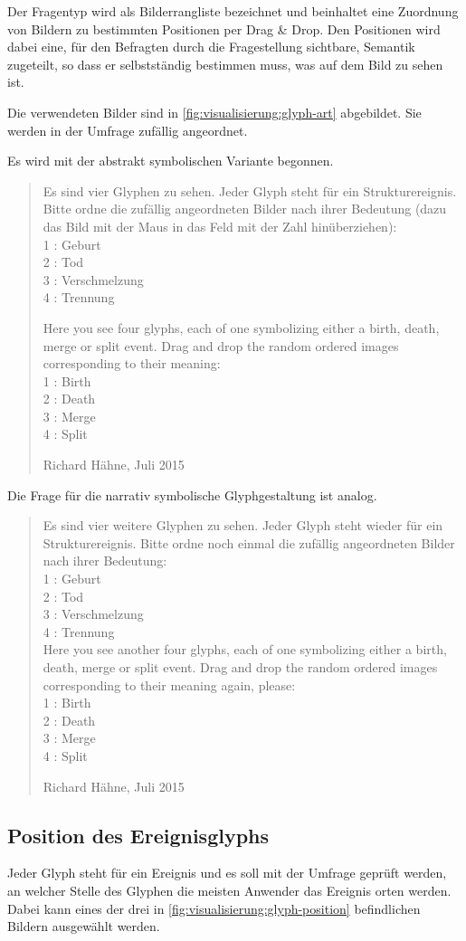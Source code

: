 Der Fragentyp wird als Bilderrangliste bezeichnet und beinhaltet eine Zuordnung von Bildern zu bestimmten Positionen per Drag \& Drop. Den Positionen wird dabei eine, für den Befragten durch die Fragestellung sichtbare, Semantik zugeteilt, so dass er selbstständig bestimmen muss, was auf dem Bild zu sehen ist.

Die verwendeten Bilder sind in \autoref{fig:visualisierung:glyph-art} abgebildet. Sie werden in der Umfrage zufällig angeordnet.

Es wird mit der abstrakt symbolischen Variante begonnen.

\blockquote[Richard Hähne, Juli 2015]{
	Es sind vier Glyphen zu sehen. Jeder Glyph steht für ein Strukturereignis. Bitte ordne die zufällig angeordneten Bilder nach ihrer Bedeutung (dazu das Bild mit der Maus in das Feld mit der Zahl hinüberziehen):\\
	1 : Geburt\\
	2 : Tod\\
	3 : Verschmelzung\\
	4 : Trennung
	
	Here you see four glyphs, each of one symbolizing either a birth, death, merge or split event. Drag and drop the random ordered images corresponding to their meaning:\\
	1 : Birth\\
	2 : Death\\
	3 : Merge\\
	4 : Split
}

Die Frage für die narrativ symbolische Glyphgestaltung ist analog.
\blockquote[Richard Hähne, Juli 2015]{
	Es sind vier weitere Glyphen zu sehen. Jeder Glyph steht wieder für ein Strukturereignis. Bitte ordne noch einmal die zufällig angeordneten Bilder nach ihrer Bedeutung:\\
	1 : Geburt\\
	2 : Tod\\
	3 : Verschmelzung\\
	4 : Trennung\\
	
	Here you see another four glyphs, each of one symbolizing either a birth, death, merge or split event. Drag and drop the random ordered images corresponding to their meaning again, please:\\
	1 : Birth\\
	2 : Death\\
	3 : Merge\\
	4 : Split
}


\subsection*{Position des Ereignisglyphs}
Jeder Glyph steht für ein Ereignis und es soll mit der Umfrage geprüft werden, an welcher Stelle des Glyphen die meisten Anwender das Ereignis orten werden. Dabei kann eines der drei in \autoref{fig:visualisierung:glyph-position} befindlichen Bildern ausgewählt werden.

